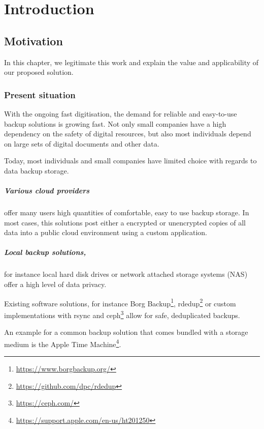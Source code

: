 \chapter{Introduction}
\label{sec:introduction}

\section{Motivation}
In this chapter, we legitimate this work and explain the value and applicability of our proposed solution.

\subsection{Present situation}
With the ongoing fast digitisation, the demand for reliable and easy-to-use backup solutions is growing fast. Not only small companies have a high dependency on the safety of digital resources, but also most individuals depend on large sets of digital documents and other data.

Today, most individuals and small companies have limited choice with regards to data backup storage.

\paragraph{Various cloud providers} offer many users high quantities of comfortable, easy to use backup storage. In most cases, this solutions post either a encrypted or unencrypted copies of all data into a public cloud environment using a custom application.

\paragraph{Local backup solutions,} for instance local hard disk drives or network attached storage systems (NAS) offer a high level of data privacy. 

Existing software solutions, for instance Borg Backup\footnote{\url{https://www.borgbackup.org/}}, rdedup\footnote{\url{https://github.com/dpc/rdedup}} or custom implementations with rsync and ceph\footnote{\url{https://ceph.com/}} allow for safe, deduplicated backups.

An example for a common backup solution that comes bundled with a storage medium is the Apple Time Machine\footnote{\url{https://support.apple.com/en-us/ht201250}}.


